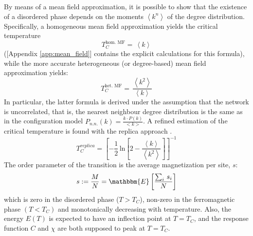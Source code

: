 \noindent By means of a mean field approximation, it is possible to show that the existence of a disordered phase depends on the moments $\left\langle k^n\right\rangle$ of the degree distribution. Specifically, a homogeneous mean field approximation yields the critical temperature
\begin{equation} \label{eq:hom_mean_field}
    T_C^{\text{hom. MF}} =\,\left\langle k \right \rangle
\end{equation}
 ([Appendix \ref{app:mean_field}] contains the explicit calculations for this formula), while the more accurate heterogeneous (or degree-based) mean field approximation yields:
\begin{equation} \label{eq:het_mean_field}
    T_C^{\text{het. MF}} =\,\frac{\left\langle k^2 \right \rangle}{\left\langle k \right \rangle}
\end{equation}
In particular, the latter formula is derived under the assumption that the network is uncorrelated, that is, the nearest neighbour degree distribution is the same as in the configuration model $P_{n.n.} (k)=\frac{k\cdot P(k)}{<k>}$.
A refined estimation of the critical temperature is found with the replica approach \cite{analytical_ising}. \\ 
\begin{equation}
    T_C^{replica} = \left[ -\frac{1}{2}\,\text{ln}\left[2- \frac{\left\langle k \right\rangle}{\left\langle k^2 \right\rangle}\right]\right]^{-1}
\label{eq:replica}    
\end{equation}
The order parameter of the transition is the average magnetization per site, $s$:
$$
s := \frac{M}{N} = \mathbbm{E}\left[\frac{\sum_{i}\,s_i}{N}\right]
$$
which is zero in the disordered phase ($T>T_C$), non-zero in the ferromagnetic  phase $(T<T_C)$ and monotonically decreasing with temperature. Also, the energy $E(T)$ is expected to have an inflection point at $T=T_C$, and the response function $C$ and $\chi$ are both supposed to peak at $T=T_C$.

